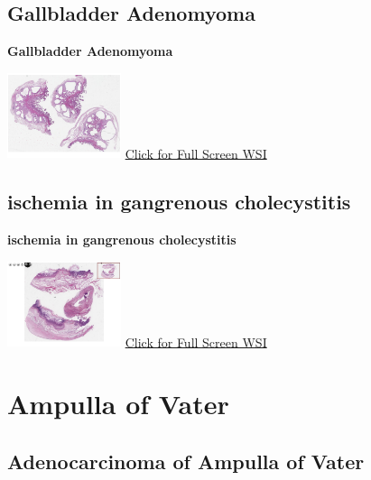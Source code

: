 \documentclass[
  letterpaper,
  paper=6in:9in,
  pagesize=pdftex,
  headinclude=on,
  footinclude=on,
  12pt]{scrbook}
\begin{document}
\hypertarget{sec-gallbladder-adenomyoma}{%
\section{Gallbladder Adenomyoma}\label{sec-gallbladder-adenomyoma}}

\textbf{Gallbladder Adenomyoma}

\href{https://images.patolojiatlasi.com/gallbladder-adenomyoma/HE.html}{\includegraphics[width=0.25\textwidth,height=\textheight]{./screenshots/gallbladder-adenomyoma_screenshot.png}}
\href{https://images.patolojiatlasi.com/gallbladder-adenomyoma/HE.html}{Click
for Full Screen WSI}

\hypertarget{sec-ischemia-gangrenous-cholecystitis}{%
\section{ischemia in gangrenous
cholecystitis}\label{sec-ischemia-gangrenous-cholecystitis}}

\textbf{ischemia in gangrenous cholecystitis}

\href{https://images.patolojiatlasi.com/ischemia-gangrenous-cholecystitis/HE.html}{\includegraphics[width=0.25\textwidth,height=\textheight]{./screenshots/ischemia-gangrenous-cholecystitis_screenshot.png}}
\href{https://images.patolojiatlasi.com/ischemia-gangrenous-cholecystitis/HE.html}{Click
for Full Screen WSI}

\hypertarget{sec-ampulla-of-vater}{%
\chapter{Ampulla of Vater}\label{sec-ampulla-of-vater}}

\hypertarget{sec-adenocarcinoma-of-ampulla-of-vater}{%
\section{Adenocarcinoma of Ampulla of
Vater}\label{sec-adenocarcinoma-of-ampulla-of-vater}}
\end{document}
